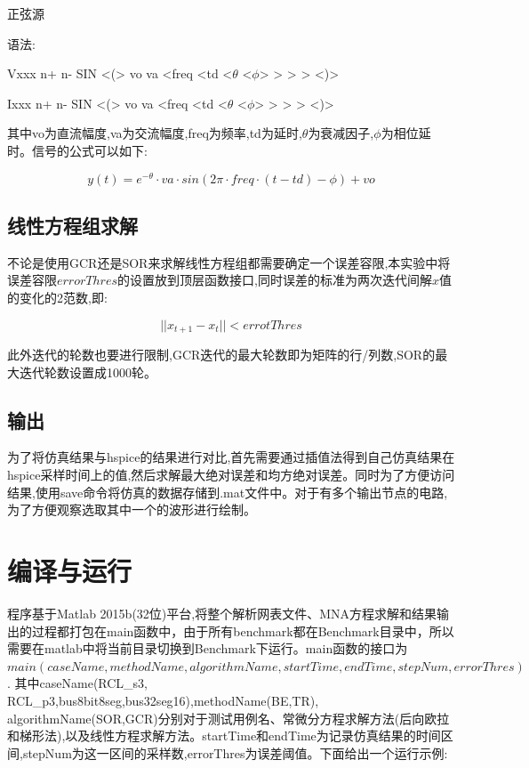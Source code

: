 \documentclass[12pt]{article}
\begin{document}
\begin{sloppypar}
\qquad 正弦源

\qquad 语法:

\qquad Vxxx n+ n- SIN <(> vo va <freq <td <$\theta$ <$\phi$> > > > <)>

\qquad Ixxx n+ n- SIN <(> vo va <freq <td <$\theta$ <$\phi$> > > > <)>

\qquad 其中vo为直流幅度,va为交流幅度,freq为频率,td为延时,$\theta$为衰减因子,$\phi$为相位延时。信号的公式可以如下:

\begin{equation}
  y(t) = e^{-\theta}\cdot va \cdot sin(2\pi \cdot freq \cdot(t-td) - \phi) + vo
\end{equation}


\subsection{线性方程组求解}
\qquad 不论是使用GCR还是SOR来求解线性方程组都需要确定一个误差容限,本实验中将误差容限$errorThres$的设置放到顶层函数接口,同时误差的标准为两次迭代间解$x$值的变化的2范数,即:

\begin{equation}
  ||x_{t+1} - x_{t}|| < errotThres
\end{equation}

\qquad 此外迭代的轮数也要进行限制,GCR迭代的最大轮数即为矩阵的行/列数,SOR的最大迭代轮数设置成1000轮。

\subsection{输出}
\qquad 为了将仿真结果与hspice的结果进行对比,首先需要通过插值法得到自己仿真结果在hspice采样时间上的值,然后求解最大绝对误差和均方绝对误差。同时为了方便访问结果,使用save命令将仿真的数据存储到.mat文件中。对于有多个输出节点的电路,为了方便观察选取其中一个的波形进行绘制。

\section{编译与运行}
\qquad 程序基于Matlab 2015b(32位)平台,将整个解析网表文件、MNA方程求解和结果输出的过程都打包在main函数中，由于所有benchmark都在Benchmark目录中，所以需要在matlab中将当前目录切换到Benchmark下运行。main函数的接口为$main(caseName, methodName,algorithmName, startTime, endTime, stepNum, errorThres)$. 其中caseName(RCL\_s3, RCL\_p3,bus8bit8seg,bus32seg16),methodName(BE,TR), \\ algorithmName(SOR,GCR)分别对于测试用例名、常微分方程求解方法(后向欧拉和梯形法),以及线性方程求解方法。startTime和endTime为记录仿真结果的时间区间,stepNum为这一区间的采样数,errorThres为误差阈值。下面给出一个运行示例:


\end{sloppypar}
\end{document}
